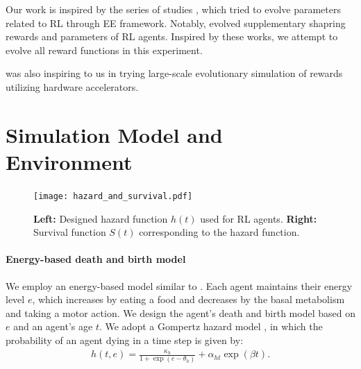 Our work is inspired by the series of studies \citep{elfwingBiologicallyInspiredEmbodied2005,elfwingDarwinianEmbodiedEvolution2011,elfwingEmergencePolymorphicMating2014}, which tried to evolve parameters related to RL through EE framework. Notably, \citet{elfwingDarwinianEmbodiedEvolution2011} evolved supplementary shapring rewards and parameters of RL agents.
Inspired by these works, we attempt to evolve all reward functions in this experiment.

\citet{zhengWhatCanLearned2020} was also inspiring to us in trying large-scale evolutionary simulation of rewards utilizing hardware accelerators.

\section{Simulation Model and Environment}\label{sec:method}

\begin{figure}[t]
  \centering{}
  \texttt{[image: hazard\_and\_survival.pdf]}
  \caption{
    \textbf{Left:} Designed hazard function $h(t)$ used for RL agents.
    \textbf{Right:} Survival function $S(t)$ corresponding to the hazard function.
  }\label{figure:hs}
\end{figure}

\paragraph{Energy-based death and birth model}
We employ an energy-based model similar to \citet{hamonEcoevolutionaryDynamicsNonepisodic2023}. Each agent maintains their energy level $e$, %
which increases by eating a food and decreases by the basal metabolism and taking a motor action. 
We design the agent's death and birth model
based on $e$ and an agent's age $t$.
We adopt a Gompertz hazard model \citep{gompertzXXIVNatureFunction1825,kirkwoodDecipheringDeathCommentary2015}, in which the probability of an agent dying in a time step is given by:
\begin{align}
  h(t, e) = \frac{\kappa_{h}}{1 +  \exp(e - \theta_h)} + \alpha_{ht} \exp(\beta t). 
  \label{eq:h}
\end{align}


